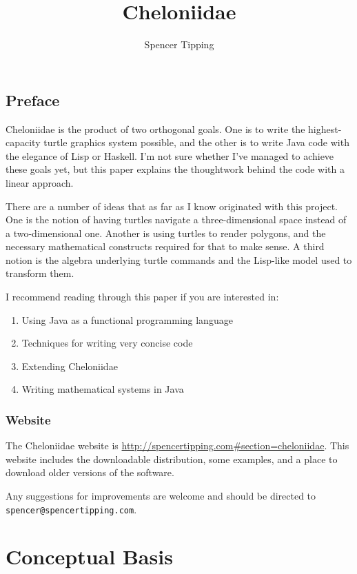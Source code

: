\documentclass{report}
\title{Cheloniidae}
\author{Spencer Tipping}
\begin{document}
\maketitle\tableofcontents

\sloppy
  \chapter*{Preface}

  Cheloniidae is the product of two orthogonal goals. One is to write the highest-capacity turtle graphics system possible, and the other is to write Java code
  with the elegance of Lisp or Haskell. I'm not sure whether I've managed to achieve these goals yet, but this paper explains the thoughtwork behind the code
  with a linear approach.

  There are a number of ideas that as far as I know originated with this project. One is the notion of having turtles navigate a three-dimensional space instead
  of a two-dimensional one. Another is using turtles to render polygons, and the necessary mathematical constructs required for that to make sense. A third
  notion is the algebra underlying turtle commands and the Lisp-like model used to transform them.

  I recommend reading through this paper if you are interested in:

\begin{enumerate}
\item Using Java as a functional programming language
\item Techniques for writing very concise code
\item Extending Cheloniidae
\item Writing mathematical systems in Java
\end{enumerate}

  \section*{Website}
  The Cheloniidae website is \url{http://spencertipping.com#section=cheloniidae}. This website includes the downloadable distribution, some examples, and a
  place to download older versions of the software.

  Any suggestions for improvements are welcome and should be directed to {\tt spencer@spencertipping.com}.

\part {Conceptual Basis} \label{sec:conceptual-basis}
\end{document}
